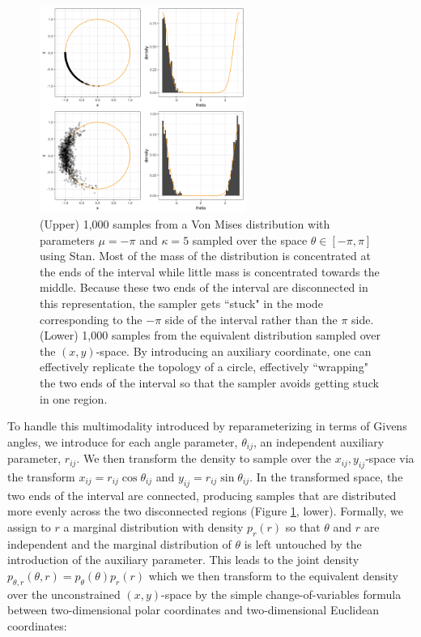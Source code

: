 \documentclass[ba]{imsart}
\numberwithin{equation}{section}
\theoremstyle{plain}
\begin{document}
\begin{figure}[h]
\centering
\vspace{.1in}
\includegraphics[width=0.6\textwidth]{figures/donut.png}
\vspace{.05in}
\caption{(Upper) 1,000 samples from a Von Mises distribution with parameters $\mu = -\pi$ and $\kappa = 5$ sampled over the space $\theta \in [-\pi, \pi]$ using Stan. Most of the mass of the distribution is concentrated at the ends of the interval while little mass is concentrated towards the middle. Because these two ends of the interval are disconnected in this representation, the sampler gets ``stuck" in the mode corresponding to the $-\pi$ side of the interval rather than the $\pi$ side. (Lower) 1,000 samples from the equivalent distribution sampled over the $(x,y)$-space. By introducing an auxiliary coordinate, one can effectively replicate the topology of a circle, effectively ``wrapping" the two ends of the interval so that the sampler avoids getting stuck in one region.}
\label{fig:donut}
\end{figure}

\noindent To handle this multimodality introduced by reparameterizing in terms of Givens angles, we introduce for each angle parameter, $\theta_{ij}$, an independent auxiliary parameter, $r_{ij}$. We then transform the density to sample over the $x_{ij},y_{ij}$-space via the transform $x_{ij} = r_{ij} \cos \theta_{ij}$ and $y_{ij} = r_{ij} \sin \theta_{ij}$. In the transformed space, the two ends of the interval are connected, producing samples that are distributed more evenly across the two disconnected regions (Figure \ref{fig:donut}, lower). Formally, we assign to $r$ a marginal distribution with density $p_r(r)$ so that $\theta$ and $r$ are independent and the marginal distribution of $\theta$ is left untouched by the introduction of the auxiliary parameter. This leads to the joint density $p_{\theta, r}(\theta, r) = p_\theta(\theta) p_r(r)$ which we then transform to the equivalent density over the unconstrained $(x,y)$-space by the simple change-of-variables formula between two-dimensional polar coordinates and two-dimensional Euclidean coordinates:
\end{document}
